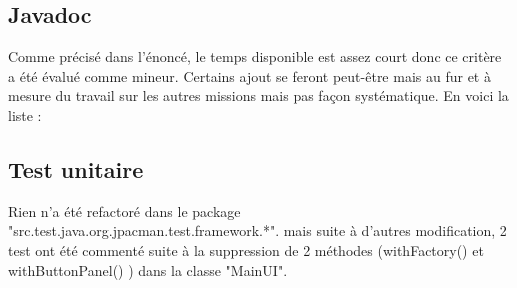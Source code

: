 \documentclass[12pt,a4paper,final]{article}
\begin{document}
\subsection{Javadoc}\label{javadoc_refact}
Comme précisé dans l'énoncé, le temps disponible est assez court donc ce critère a été évalué comme mineur. Certains ajout se feront peut-être mais au fur et à mesure du travail sur les autres missions mais pas façon systématique. En voici la liste : 

\subsection{Test unitaire}\label{unitTest_refact}
Rien n'a été refactoré dans le package "src.test.java.org.jpacman.test.framework.*". mais suite à d'autres modification, 2 test ont été commenté suite à la suppression de 2 méthodes (withFactory() et withButtonPanel() ) dans la classe "MainUI".

\end{document}
